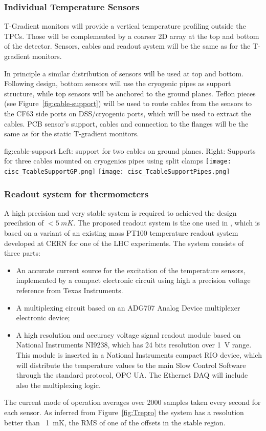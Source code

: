 \subsubsection{Individual Temperature Sensors}

T-Gradient monitors will provide a vertical temperature profiling outside the TPCs. Those will be complemented by a coarser 2D array at the top and bottom of the
detector. Sensors, cables and readout system will be the same as for the T-gradient monitors. 

In principle a similar distribution of sensors will be used at top and bottom.
Following  design, bottom sensors will use the cryogenic pipes as support structure, while top sensors will be anchored to the ground planes.
Teflon pieces (see Figure~\ref{fig:cable-support}) will be used to route cables from the sensors to the CF63 side ports on DSS/cryogenic ports, which will be used to extract the cables.
PCB sensor's support, cables and connection to the flanges will be the same as for the static T-gradient monitors. 

\begin{dunefigure}{fig:cable-support}
  {Left: support for two cables on ground planes. Right: Supports for three cables  mounted on cryogenics pipes using split clamps}
  \texttt{[image: cisc\_TcableSupportGP.png]}
  \texttt{[image: cisc\_TcableSupportPipes.png]}
\end{dunefigure}


\subsubsection{Readout system for thermometers}
\label{sec:fdgen-slow-cryo-therm-readout}

A high precision and very stable system is required to achieved the design precihsion of $< \SI{5}{mK}$.
The proposed readout system is the one used in , which is based on a variant of an existing mass PT100 temperature readout system developed at
CERN for one of the LHC experiments. The system consists of three parts:
\begin{itemize}
\item An accurate current source for the excitation of the temperature sensors, implemented by a compact electronic circuit using high a precision voltage reference from Texas Instruments. 
\item A multiplexing circuit based on an ADG707 Analog Device multiplexer electronic device;
\item A high resolution and accuracy voltage signal readout module based on National Instruments NI9238, which has 24 bits resolution over \SI{1}{V} range.
  This module is inserted in a National Instruments compact RIO device, which will distribute the temperature values to the main Slow Control Software
  through the standard protocol, OPC UA. The Ethernet DAQ will include also the multiplexing logic.
\end{itemize}


The current mode of operation averages over 2000 samples taken every second for each sensor. 
As inferred from Figure~\ref{fig:Trepro} the system has a resolution better than \
\SI{1}{mK}, the RMS of one of the offsets in the stable region.

